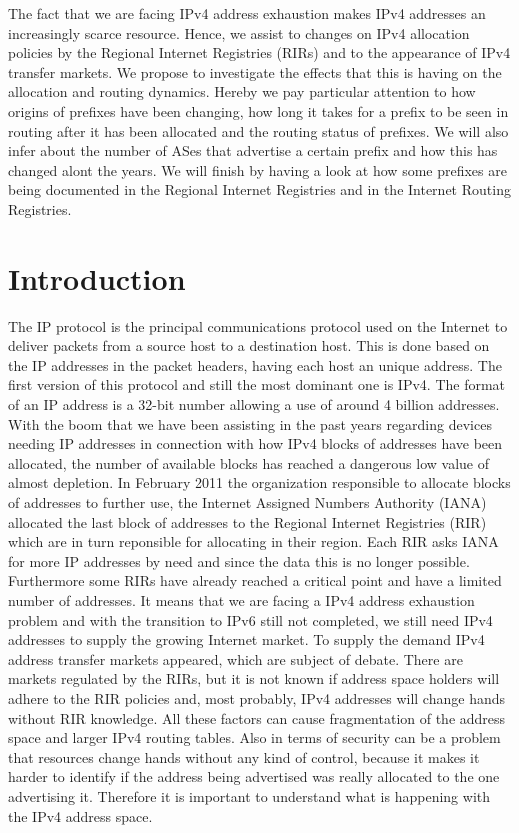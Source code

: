 \documentclass[11pt,a4paper]{scrreprt}
\begin{document}
The fact that we are facing IPv4 address exhaustion makes IPv4 addresses an
increasingly scarce resource. Hence, we assist to changes on IPv4 allocation policies by the Regional Internet Registries (RIRs) and to the appearance of IPv4 transfer markets. We propose to investigate the effects that this is having on the allocation and routing dynamics. Hereby we pay particular attention to how origins of prefixes have been changing, how long it takes for a prefix to be seen in routing after it has been allocated and the routing status of prefixes. We will also infer about the number of ASes that advertise a certain prefix and how this has changed alont the years. We will finish by having a look at how some prefixes are being documented in the Regional Internet Registries and in the Internet Routing Registries. 

\tableofcontents
\listoffigures
\listoftables



\chapter{Introduction}

The IP protocol is the principal communications protocol used on the Internet to deliver packets from a source host to a destination host. This is done based on the IP addresses in the packet headers, having each host an unique address. 
The first version of this protocol and still the most dominant one is IPv4. The format of an IP address is a 32-bit number allowing a use of around 4 billion addresses. With the boom that we have been assisting in the past years regarding devices needing IP addresses in connection with how IPv4 blocks of addresses have been allocated, the number of available blocks has reached a dangerous low value of almost depletion.      
In February 2011 the organization responsible to allocate blocks of addresses to further use, the Internet Assigned Numbers Authority (IANA) allocated the last block of addresses to the Regional Internet Registries (RIR) which are in turn reponsible for allocating in their region. Each RIR asks IANA for more IP addresses by need and since the data this is no longer possible. Furthermore some RIRs have already reached a critical point and have a limited number of addresses. It means that we are facing a IPv4 address exhaustion problem and with the transition to IPv6 still not completed, we still need IPv4 addresses to supply the growing Internet market. To supply the demand IPv4 address transfer markets appeared, which are subject of debate. There are markets regulated by the RIRs, but it is not known if address space holders will adhere to the RIR policies and, most probably, IPv4 addresses will change hands without RIR knowledge.
All these factors can cause fragmentation of the address space and larger IPv4 routing tables. Also in terms of security can be a problem that resources change hands without any kind of control, because it makes it harder to identify if the address being advertised was really allocated to the one advertising it. 
Therefore it is important to understand what is happening with the IPv4 address space. 
\end{document}
